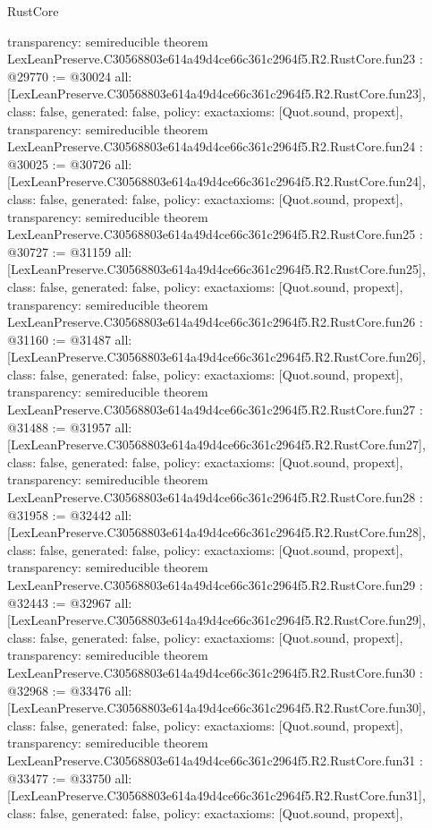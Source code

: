 \begin{lexlean}{RustCore}
\begin{coremodule}
{  transparency: semireducible
}
theorem LexLeanPreserve.C30568803e614a49d4ce66c361c2964f5.R2.RustCore.fun23 : @29770 := @30024 {
  all: [LexLeanPreserve.C30568803e614a49d4ce66c361c2964f5.R2.RustCore.fun23],
  class: false,
  generated: false,
  policy: exact{axioms: [Quot.sound, propext]},
  transparency: semireducible
}
theorem LexLeanPreserve.C30568803e614a49d4ce66c361c2964f5.R2.RustCore.fun24 : @30025 := @30726 {
  all: [LexLeanPreserve.C30568803e614a49d4ce66c361c2964f5.R2.RustCore.fun24],
  class: false,
  generated: false,
  policy: exact{axioms: [Quot.sound, propext]},
  transparency: semireducible
}
theorem LexLeanPreserve.C30568803e614a49d4ce66c361c2964f5.R2.RustCore.fun25 : @30727 := @31159 {
  all: [LexLeanPreserve.C30568803e614a49d4ce66c361c2964f5.R2.RustCore.fun25],
  class: false,
  generated: false,
  policy: exact{axioms: [Quot.sound, propext]},
  transparency: semireducible
}
theorem LexLeanPreserve.C30568803e614a49d4ce66c361c2964f5.R2.RustCore.fun26 : @31160 := @31487 {
  all: [LexLeanPreserve.C30568803e614a49d4ce66c361c2964f5.R2.RustCore.fun26],
  class: false,
  generated: false,
  policy: exact{axioms: [Quot.sound, propext]},
  transparency: semireducible
}
theorem LexLeanPreserve.C30568803e614a49d4ce66c361c2964f5.R2.RustCore.fun27 : @31488 := @31957 {
  all: [LexLeanPreserve.C30568803e614a49d4ce66c361c2964f5.R2.RustCore.fun27],
  class: false,
  generated: false,
  policy: exact{axioms: [Quot.sound, propext]},
  transparency: semireducible
}
theorem LexLeanPreserve.C30568803e614a49d4ce66c361c2964f5.R2.RustCore.fun28 : @31958 := @32442 {
  all: [LexLeanPreserve.C30568803e614a49d4ce66c361c2964f5.R2.RustCore.fun28],
  class: false,
  generated: false,
  policy: exact{axioms: [Quot.sound, propext]},
  transparency: semireducible
}
theorem LexLeanPreserve.C30568803e614a49d4ce66c361c2964f5.R2.RustCore.fun29 : @32443 := @32967 {
  all: [LexLeanPreserve.C30568803e614a49d4ce66c361c2964f5.R2.RustCore.fun29],
  class: false,
  generated: false,
  policy: exact{axioms: [Quot.sound, propext]},
  transparency: semireducible
}
theorem LexLeanPreserve.C30568803e614a49d4ce66c361c2964f5.R2.RustCore.fun30 : @32968 := @33476 {
  all: [LexLeanPreserve.C30568803e614a49d4ce66c361c2964f5.R2.RustCore.fun30],
  class: false,
  generated: false,
  policy: exact{axioms: [Quot.sound, propext]},
  transparency: semireducible
}
theorem LexLeanPreserve.C30568803e614a49d4ce66c361c2964f5.R2.RustCore.fun31 : @33477 := @33750 {
  all: [LexLeanPreserve.C30568803e614a49d4ce66c361c2964f5.R2.RustCore.fun31],
  class: false,
  generated: false,
  policy: exact{axioms: [Quot.sound, propext]},
}
\end{coremodule}
\end{lexlean}
